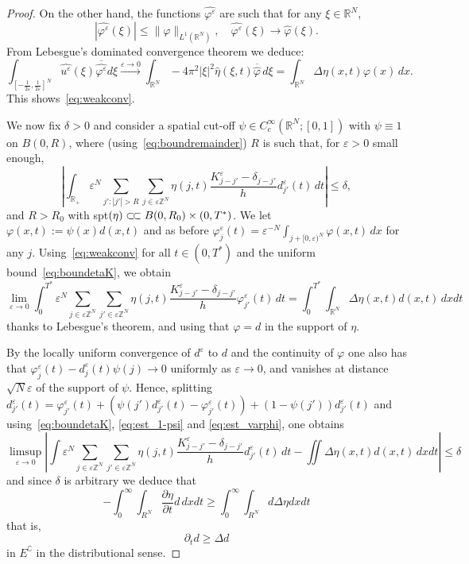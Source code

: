 \documentclass[10pt]{amsart}
\theoremstyle{plain}
\theoremstyle{definition}
\newcommand{\R}{\mathbb{R}}
\newcommand{\Z}{\mathbb{Z}}
\newcommand{\comp}[1]{{#1}^\complement}
\newcommand{\e}{\varepsilon}
\numberwithin{equation}{section}
\begin{document}
\begin{proof}
 On the other hand, the functions $\widehat{\varphi^\e}$ are such that for any $\xi\in\R^N$,
  \[
    |\widehat{\varphi^\e}(\xi)|\le \lVert\varphi\rVert_{L^1(\R^N)},\quad
    \widehat{\varphi^\e}(\xi) \to \widehat{\varphi}(\xi).
  \]
  From Lebesgue's dominated convergence theorem we deduce:
   \[
   \int_{[-\frac{1}{2\e},\frac{1}{2\e}]^N}
   \widehat{u^\e}(\xi) \overline{\widehat{\varphi^\e}} d\xi
   \stackrel{\e\to 0}{\longrightarrow}
   \int_{\R^N}  -4\pi^2|\xi|^2\widehat{\eta}(\xi,t)\overline{\widehat{\varphi}}\,d\xi
   = \int_{\R^N} \Delta\eta(x,t)\varphi(x)\,dx.
 \]
 This shows~\eqref{eq:weakconv}.

 We now fix $\delta>0$ and consider a spatial cut-off $\psi\in C_c^\infty(\R^N;[0,1])$ with $\psi\equiv 1$ on  $B(0,R)$, where (using~\eqref{eq:boundremainder}) $R$ is such that, for $\e>0$
 small enough,
\begin{equation}\label{eq:est_1-psi}
\left|  \int_{\R_+}\e^N\sum_{j':|j'|>R} \sum_{j\in \e\Z^N} \eta(j,t) \frac{K^\e_{j-j'}-\delta_{j-j'}}{h}d^\e_{j'}(t)\,dt\right|
  \le \delta,
\end{equation}
and $R>R_0$ with spt$(\eta)\subset\joinrel\subset B(0,R_0)\times (0,T^*)$.
We let $\varphi(x,t):=\psi(x)d(x,t)$ and as before $\varphi^\e_j(t) 
= \e^{-N}\int_{j+[0,\e)^N} \varphi(x,t)\,dx$ for any $j$. Using~\eqref{eq:weakconv} for
all $t\in (0,T^*)$ and the uniform bound~\eqref{eq:boundetaK}, we obtain
\begin{equation}\label{eq:est_varphi}
\lim_{\e\to 0}\int_0^{T^*} \e^N \sum_{j\in\e\Z^N} \sum_{j'\in\e \Z^N} \eta(j,t)  \frac{K^\e_{j-j'}-\delta_{j-j'}}{h}\varphi^\e_{j'}(t)\, dt
= \int_0^{T^*} \int_{\R^N} \Delta \eta (x,t)d(x,t) \,dx  dt
\end{equation}
thanks to Lebesgue's theorem, and using that $\varphi=d$ in the support of $\eta$.

By the locally uniform convergence of $d^\e$ to $d$
and the continuity of $\varphi$ one also has
that $\varphi^\e_j(t)-d_j^\e(t)\psi(j)\to 0$ uniformly as $\e \to 0$,
and vanishes at distance $\sqrt{N}\e$ of the support of $\psi$.
Hence,  splitting
$d^\e_{j'}(t)=\varphi^\e_{j'}(t) + (\psi(j')d_{j'}^\e(t)-\varphi^\e_{j'}(t)) + (1-\psi(j'))d_{j'}^\e(t)$ and using~\eqref{eq:boundetaK}, \eqref{eq:est_1-psi} and \eqref{eq:est_varphi}, one obtains
\begin{equation*}
  \limsup_{\e\to 0}
  \left| \int\e^N\!\!\sum_{j\in\e\Z^N} \sum_{j'\in \e\Z^N}\!\! \eta(j,t) \frac{K^\e_{j-j'}-\delta_{j-j'}}{h}d^\e_{j'}(t)
   \,dt -
   \iint \Delta \eta (x,t)d(x,t) \,dx  dt\right|
 \le \delta
\end{equation*}
and since $\delta$ is arbitrary we deduce that
\[  -\int_0^\infty \int_{R^N} \frac{\partial\eta}{\partial t} d\,dxdt
  \ge \int_0^\infty \int_{R^N} d\Delta\eta dxdt
\]
that is,
\begin{equation}\label{eq:super}
  \partial_t d \ge \Delta d
\end{equation}
in $\comp{E}$ in the distributional sense.
\end{proof}
\end{document}
